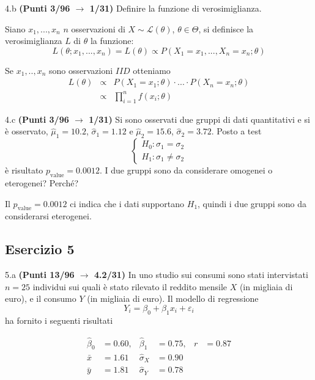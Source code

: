 \documentclass[
  11pt,
]{book}
\theoremstyle{mytheoremstyle}
\theoremstyle{mydefstyle}
\newenvironment{sol}
  {
  \begin{tcolorbox}[enhanced,breakable,arc=0.1mm,boxrule=1pt,colback=white,colframe=iblue,
  title=\bf \fontfamily{lmss}\selectfont \hspace{.5 cm} Soluzione,drop fuzzy shadow]

}{
\end{tcolorbox}
  }
\begin{document}
4.b \textbf{(Punti 3/96 \(\rightarrow\) 1/31)} Definire la funzione di verosimiglianza.

\begin{sol}
Siano \(x_1,...,x_n\) \(n\) osservazioni di \(X\sim \mathscr{L}(\theta)\), \(\theta\in\Theta\), si definisce la verosimiglianza \(L\) di \(\theta\) la funzione:
\[L(\theta;x_1,...,x_n)=L(\theta)\propto P(X_1=x_1,...,X_n=x_n;\theta)\]

Se \(x_1,..,x_n\) sono osservazioni \(IID\) otteniamo
\begin{eqnarray*}
L(\theta) &\propto& P(X_1=x_1;\theta)\cdot...\cdot P(X_n=x_n;\theta) \\
          &\propto& \prod_{i=1}^n f(x_i;\theta)
\end{eqnarray*}

\end{sol}

4.c \textbf{(Punti 3/96 \(\rightarrow\) 1/31)} Si sono osservati due gruppi di dati quantitativi e si è osservato, \(\hat\mu_1=10.2\), \(\hat\sigma_1=1.12\) e \(\hat\mu_2=15.6\), \(\hat\sigma_2=3.72\). Posto a test
\[
\begin{cases}
H_0:\sigma_1=\sigma_2\\
H_1:\sigma_1\ne \sigma_2
\end{cases}
\]
è risultato \(p_\text{value}=0.0012\). I due gruppi sono da considerare omogenei o eterogenei? Perché?

\begin{sol}
Il \(p_\text{value}=0.0012\) ci indica che i dati supportano \(H_1\), quindi i due gruppi
sono da considerarsi eterogenei.

\end{sol}

\subsection{Esercizio 5}\label{esercizio-5-3}

5.a \textbf{(Punti 13/96 \(\rightarrow\) 4.2/31)} In uno studio sui consumi sono stati intervistati \(n=25\) individui
sui quali è stato rilevato il reddito mensile \(X\) (in migliaia di euro), e il consumo \(Y\) (in migliaia di euro). Il modello di regressione
\[
Y_i=\beta_0+\beta_1 x_i+\varepsilon_i
\]
ha fornito i seguenti risultati

\begin{align*}
\hat\beta_0&=0.60, &\hat\beta_1&=0.75, &r&=0.87\\
\bar x&=1.61 &\hat \sigma_X&=0.90\\
\bar y&=1.81 &\hat \sigma_Y&=0.78\\
\end{align*}
\end{document}

